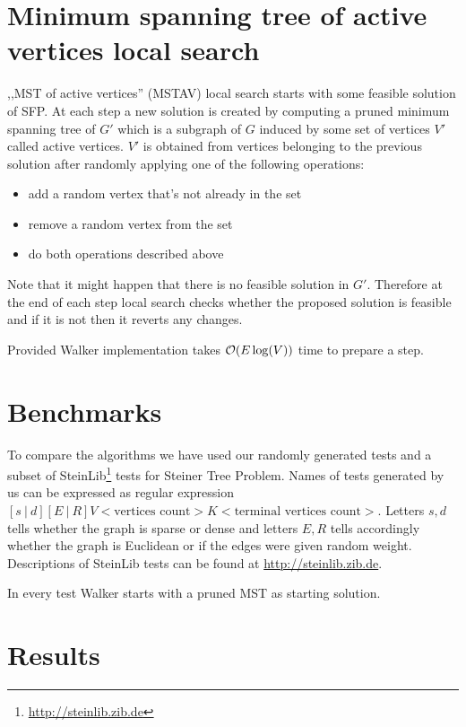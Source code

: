 \section{Minimum spanning tree of active vertices local search}
,,MST of active vertices'' (MSTAV) local search starts with some feasible solution of SFP. At each step a new solution is created by computing a pruned minimum spanning tree of $G'$ which is a subgraph of $G$ induced by some set of vertices $V'$ called active vertices. $V'$ is obtained from vertices belonging to the previous solution after randomly applying one of the following operations:
\begin{itemize}
\item add a random vertex that's not already in the set
\item remove a random vertex from the set
\item do both operations described above
\end{itemize}

Note that it might happen that there is no feasible solution in $G'$. Therefore at the end of each step local search checks whether the proposed solution is feasible and if it is not then it reverts any changes.

Provided Walker implementation takes $\mathcal{O}(E \log(V))$ time to prepare a step.

\section{Benchmarks}
To compare the algorithms we have used our randomly generated tests and a subset of SteinLib\footnote{\url{http://steinlib.zib.de}} tests for Steiner Tree Problem.
Names of tests generated by us can be expressed as regular expression $[s\ |\ d][E\ |\ R]V<\text{vertices count}>K<\text{terminal vertices count}>$. Letters $s, d$ tells whether the graph is sparse or dense and letters $E, R$ tells accordingly whether the graph is Euclidean or if the edges were given random weight. Descriptions of SteinLib tests can be found at \url{http://steinlib.zib.de}.

In every test Walker starts with a pruned MST as starting solution.
\section{Results}

